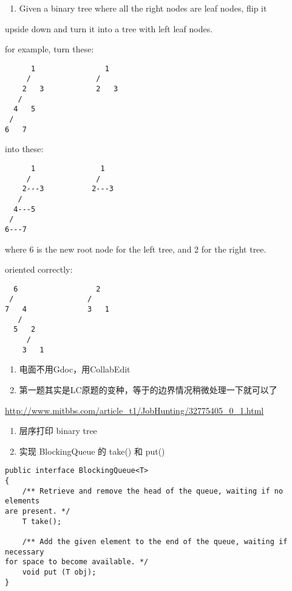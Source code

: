 \documentclass[12pt]{book}
\begin{document}
\begin{enumerate}
\item Given a binary tree where all the right nodes are leaf nodes, flip it
\end{enumerate}
upside down and turn it into a tree with left leaf nodes.

for example, turn these:
\lstset{language=java,label= ,caption= ,numbers=none}
\begin{lstlisting}
      1                1
     /               / 
    2   3            2   3
   / 
  4   5
 / 
6   7
\end{lstlisting}

into these:
\lstset{language=java,label= ,caption= ,numbers=none}
\begin{lstlisting}
      1               1
     /               /
    2---3           2---3
   /
  4---5
 /
6---7
\end{lstlisting}

where 6 is the new root node for the left tree, and 2 for the right tree.

oriented correctly:
\lstset{language=java,label= ,caption= ,numbers=none}
\begin{lstlisting}
  6                  2
 /                 / 
7   4              3   1
   / 
  5   2
     / 
    3   1
\end{lstlisting}

\begin{enumerate}
\item 电面不用Gdoc，用CollabEdit

\item 第一题其实是LC原题的变种，等于的边界情况稍微处理一下就可以了
\end{enumerate}

\url{http://www.mitbbs.com/article_t1/JobHunting/32775405_0_1.html}

\begin{enumerate}
\item 层序打印 binary tree

\item 实现 BlockingQueue 的 take() 和 put()
\end{enumerate}
\lstset{language=java,label= ,caption= ,numbers=none}
\begin{lstlisting}
public interface BlockingQueue<T>
{
    /** Retrieve and remove the head of the queue, waiting if no elements 
are present. */
    T take();

    /** Add the given element to the end of the queue, waiting if necessary 
for space to become available. */
    void put (T obj);
}
\end{lstlisting}
\end{document}
